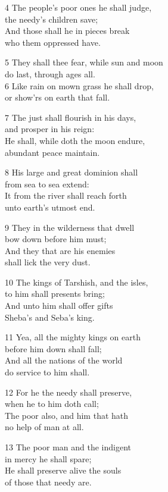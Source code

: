 \begin{multicols}{3}
4 The people’s poor ones he shall judge,\\
the needy’s children save;\\
And those shall he in pieces break\\
who them oppressed have.

5 They shall thee fear, while sun and moon\\
do last, through ages all.\\
6 Like rain on mown grass he shall drop,\\
or show’rs on earth that fall.

7 The just shall flourish in his days,\\
and prosper in his reign:\\
He shall, while doth the moon endure,\\
abundant peace maintain.

8 His large and great dominion shall\\
from sea to sea extend:\\
It from the river shall reach forth\\
unto earth’s utmost end.

9 They in the wilderness that dwell\\
bow down before him must;\\
And they that are his enemies\\
shall lick the very dust.

10 The kings of Tarshish, and the isles,\\
to him shall presents bring;\\
And unto him shall offer gifts\\
Sheba’s and Seba’s king.

11 Yea, all the mighty kings on earth\\
before him down shall fall;\\
And all the nations of the world\\
do service to him shall.

12 For he the needy shall preserve,\\
when he to him doth call;\\
The poor also, and him that hath\\
no help of man at all.

13 The poor man and the indigent\\
in mercy he shall spare;\\
He shall preserve alive the souls\\
of those that needy are.


\end{multicols}
